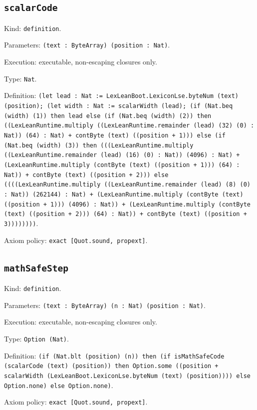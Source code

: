 \documentclass[11pt]{article}
\begin{document}
\subsection*{\texttt{scalarCode}}
\noindent Kind: \texttt{definition}.\par
\noindent Parameters: \texttt{(text : ByteArray) (position : Nat)}.\par
\noindent Execution: executable, non-escaping closures only.\par
\noindent Type: \texttt{Nat}.\par
\noindent Definition: \texttt{(let lead : Nat := LexLeanBoot.LexiconLse.byteNum (text) (position); (let width : Nat := scalarWidth (lead); (if (Nat.beq (width) (1)) then lead else (if (Nat.beq (width) (2)) then ((LexLeanRuntime.multiply ((LexLeanRuntime.remainder (lead) (32) (0) : Nat)) (64) : Nat) + contByte (text) ((position + 1))) else (if (Nat.beq (width) (3)) then (((LexLeanRuntime.multiply ((LexLeanRuntime.remainder (lead) (16) (0) : Nat)) (4096) : Nat) + (LexLeanRuntime.multiply (contByte (text) ((position + 1))) (64) : Nat)) + contByte (text) ((position + 2))) else ((((LexLeanRuntime.multiply ((LexLeanRuntime.remainder (lead) (8) (0) : Nat)) (262144) : Nat) + (LexLeanRuntime.multiply (contByte (text) ((position + 1))) (4096) : Nat)) + (LexLeanRuntime.multiply (contByte (text) ((position + 2))) (64) : Nat)) + contByte (text) ((position + 3))))))))}.\par
\noindent Axiom policy: \texttt{exact [Quot.sound, propext]}.\par
\subsection*{\texttt{mathSafeStep}}
\noindent Kind: \texttt{definition}.\par
\noindent Parameters: \texttt{(text : ByteArray) (n : Nat) (position : Nat)}.\par
\noindent Execution: executable, non-escaping closures only.\par
\noindent Type: \texttt{Option (Nat)}.\par
\noindent Definition: \texttt{(if (Nat.blt (position) (n)) then (if isMathSafeCode (scalarCode (text) (position)) then Option.some ((position + scalarWidth (LexLeanBoot.LexiconLse.byteNum (text) (position)))) else Option.none) else Option.none)}.\par
\noindent Axiom policy: \texttt{exact [Quot.sound, propext]}.\par
\end{document}
